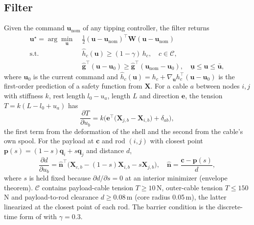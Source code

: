 \documentclass[letterpaper,10pt,conference]{IEEEtran}
\newcommand{\vect}[1]{\boldsymbol{#1}}
\begin{document}
\subsection{Filter}
Given the command $\vect u_{\mathrm{nom}}$ of any tipping controller,
the filter returns
\begin{equation}
\begin{aligned}
\vect u^\star=\arg\min_{\vect u}\;&\tfrac12(\vect u-\vect u_{\mathrm{nom}})^\top\vect W(\vect u-\vect u_{\mathrm{nom}})\\
\text{s.t.}\;&\hat h_c(\vect u)\ge(1-\gamma)\,h_c,\quad c\in\mathcal C,\\
&\hat{\vect g}^\top(\vect u-\vect u_0)\ge\hat{\vect g}^\top(\vect u_{\mathrm{nom}}-\vect u_0),\quad
\underline{\vect u}\le\vect u\le\bar{\vect u},
\end{aligned}
\label{eq:shield}
\end{equation}
where $\vect u_0$ is the current command and
$\hat h_c(\vect u)=h_c+\nabla_{\vect u}h_c^\top(\vect u-\vect u_0)$ is the
first-order prediction of a safety function from $\vect X$. For a cable
$a$ between nodes $i,j$ with stiffness $k$, rest length $l_0-u_a$,
length $L$ and direction $\vect e$, the tension $T=k(L-l_0+u_a)$ has
\begin{equation}
\frac{\partial T}{\partial u_b}=k\Big(\vect e^\top\big(\vect X_{j,b}-\vect X_{i,b}\big)+\delta_{ab}\Big),
\label{eq:dT}
\end{equation}
the first term from the deformation of the shell and the second from
the cable's own spool. For the payload at $\vect c$ and rod $(i,j)$ with
closest point $\vect p(s)=(1-s)\vect q_i+s\vect q_j$ and distance $d$,
\begin{equation}
\frac{\partial d}{\partial u_b}=\hat{\vect n}^\top\big(\vect X_{c,b}-(1-s)\vect X_{i,b}-s\vect X_{j,b}\big),
\quad\hat{\vect n}=\frac{\vect c-\vect p(s)}{d},
\label{eq:dd}
\end{equation}
where $s$ is held fixed because $\partial d/\partial s=0$ at an interior
minimizer (envelope theorem).
$\mathcal C$ contains payload-cable tension $T\ge10$\,N, outer-cable
tension $T\le150$\,N and payload-to-rod clearance $d\ge0.08$\,m (core
radius 0.05\,m), the latter linearized at the closest point of each rod.
The barrier condition is the discrete-time form of
\cite{agrawal2017dcbf} with $\gamma=0.3$.
\end{document}
